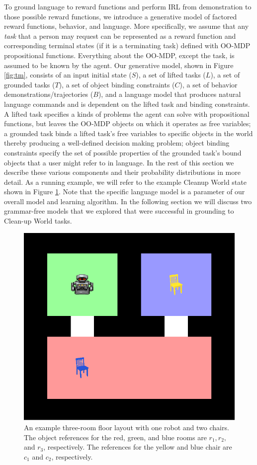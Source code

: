 \documentclass[conference]{IEEEtran}
\begin{document}
To ground language to reward functions and perform IRL from demonstration to those possible reward functions, we introduce a generative model of factored reward functions, behavior, and language. More specifically, we assume that any {\em task} that a person may request can be represented as a reward function and corresponding terminal states (if it is a terminating task) defined with OO-MDP propositional functions. 
Everything about the OO-MDP, except the task, is assumed to be known by the agent. Our generative model, shown in Figure \ref{fig:tm}, consists of an input initial state ($S$), a set of lifted tasks ($L$), a set of grounded tasks ($T$), a set of object binding constraints ($C$), a set of behavior demonstrations/trajectories ($B$), and a language model that produces natural language commands and is dependent on the lifted task and binding constraints. A lifted task specifies a kinds of problems the agent can solve with propositional functions, but leaves the OO-MDP objects on which it operates as free variables; a grounded task binds a lifted task's free variables to specific objects in the world thereby producing a well-defined decision making problem; object binding constraints specify the set of possible properties of the grounded task's bound objects that a user might refer to in language. In the rest of this section we describe these various components and their probability distributions in more detail. As a running example, we will refer to the example Cleanup World state shown in Figure \ref{fig:ef}. Note that the specific language model is a parameter of our overall model and learning algorithm. In the following section we will discuss two grammar-free models that we explored that were successful in grounding to Clean-up World tasks.


\begin{figure}[tbp]
\begin{center}
\includegraphics[width=0.7\columnwidth]{images/exampleFloor}
\caption{An example three-room floor layout with one robot and two chairs. The object references for the red, green, and blue rooms are $r_1, r_2,$ and $r_3$, respectively. The references for the yellow and blue chair are $c_1$ and $c_2$, respectively.
}
\label{fig:ef}
\end{center}
\end{figure}
\end{document}
